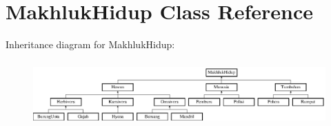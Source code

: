 \hypertarget{class_makhluk_hidup}{}\section{Makhluk\+Hidup Class Reference}
\label{class_makhluk_hidup}
Inheritance diagram for Makhluk\+Hidup\+:\begin{figure}[H]
\begin{center}
\leavevmode
\includegraphics[height=2.488889cm]{class_makhluk_hidup}
\end{center}
\end{figure}
